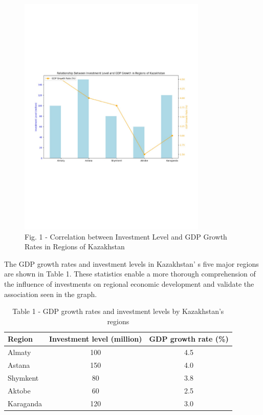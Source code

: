 \begin{figure}[H]
	\centering
	\includegraphics[width=0.8\textwidth]{media/ekon/image3}
	\caption*{Fig. 1 - Correlation between Investment Level and GDP Growth Rates in Regions of Kazakhstan}
\end{figure}

The GDP growth rates and investment levels in
Kazakhstan' s five major regions are shown in Table 1.
These statistics enable a more thorough comprehension of the influence
of investments on regional economic development and validate the
association seen in the graph.

\begin{table}[H]
\caption*{Table 1 - GDP growth rates and investment levels by Kazakhstan's regions}
\centering
\begin{tabular}{|l|c|c|}
\hline
Region & \multicolumn{1}{l|}{Investment level (million)} & \multicolumn{1}{l|}{GDP growth rate (\%)} \\ \hline
Almaty    & 100 & 4.5 \\ \hline
Astana    & 150 & 4.0 \\ \hline
Shymkent  & 80  & 3.8 \\ \hline
Aktobe    & 60  & 2.5 \\ \hline
Karaganda & 120 & 3.0 \\ \hline
\end{tabular}
\end{table}

